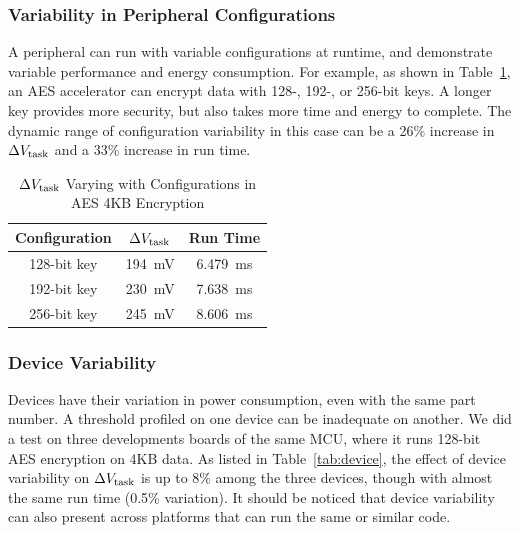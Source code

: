 

\subsubsection{Variability in Peripheral Configurations}

A peripheral can run with variable configurations at runtime, and demonstrate variable performance and energy consumption. 
For example, as shown in Table~\ref{tab:configurations}, an AES accelerator can encrypt data with 128-, 192-, or 256-bit keys. 
A longer key provides more security, but also takes more time and energy to complete.
The dynamic range of configuration variability in this case can be a 26\% increase in $\Delta V_{\text{task}}$ and a 33\% increase in run time.

\begin{table}[!t]
    \renewcommand{\arraystretch}{1.2}
    \centering
    \caption{$\Delta V_{\text{task}}$ Varying with Configurations in AES 4KB Encryption}
    \label{tab:configurations}
    \begin{tabular}{|c|c|c|}
    \hline
    \textbf{Configuration} & \textbf{$\Delta V_{\text{task}}$} & \textbf{Run Time} \\
    \hline
    128-bit key & \SI{194}{\milli\volt} & \SI{6.479}{\milli\second} \\
    192-bit key & \SI{230}{\milli\volt} & \SI{7.638}{\milli\second} \\
    256-bit key & \SI{245}{\milli\volt} & \SI{8.606}{\milli\second} \\
    \hline
    \end{tabular}
\end{table}

\subsubsection{Device Variability}

Devices have their variation in power consumption, even with the same part number. 
A threshold profiled on one device can be inadequate on another. 
We did a test on three developments boards of the same MCU, where it runs 128-bit AES encryption on 4KB data. 
As listed in Table~\ref{tab:device}, the effect of device variability on $\Delta V_{\text{task}}$ is up to 8\% among the three devices, though with almost the same run time (0.5\% variation). 
It should be noticed that device variability can also present across platforms that can run the same or similar code. 

